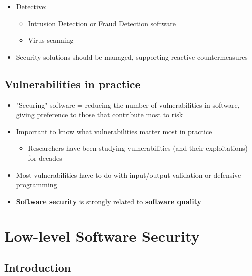 \documentclass[12pt,titlepage,a4paper]{report}
\begin{document}
\begin{itemize}
\begin{itemize}
\begin{itemize}
\begin{itemize}
							\end{itemize}
							\item Detective:
							\begin{itemize}
								\item Intrusion Detection or Fraud Detection software
								\item Virus scanning
							\end{itemize}
							\item Security solutions should be managed, supporting reactive countermeasures
						\end{itemize}
					\end{itemize}
				\end{itemize}

		\section{Vulnerabilities in practice}
			\begin{itemize}
				\item "Securing" software = reducing the number of vulnerabilities in software, giving preference to those that contribute most to risk
				\item Important to know what vulnerabilities matter most in practice
				\begin{itemize}
					\item Researchers have been studying vulnerabilities (and their exploitations) for decades
				\end{itemize}
				\item Most vulnerabilities have to do with input/output validation or defensive programming
				\item \textbf{Software security} is strongly related to \textbf{software quality}
			\end{itemize}


	\chapter{Low-level Software Security}
		\section{Introduction}
\end{document}
